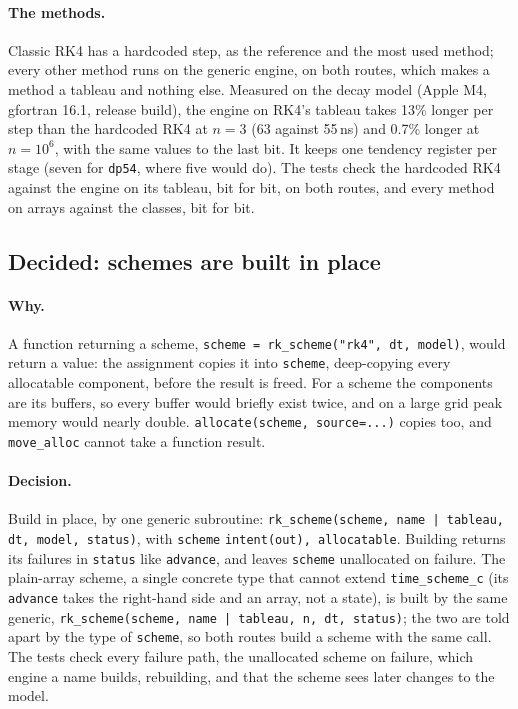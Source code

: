 \documentclass[11pt,a4paper]{article}
\newcommand{\code}[1]{\texttt{#1}}
\begin{document}
\paragraph{The methods.} Classic RK4 has a hardcoded step, as the reference
and the most used method; every other method runs on the generic engine, on
both routes, which makes a method a tableau and nothing else. Measured on the
decay model (Apple M4, gfortran 16.1, release build), the engine on RK4's
tableau takes 13\% longer per step than the hardcoded RK4 at $n = 3$ (63
against 55\,ns) and 0.7\% longer at $n = 10^6$, with the same values to the
last bit. It keeps one tendency register per stage (seven for \code{dp54},
where five would do). The tests check the hardcoded RK4 against the engine on
its tableau, bit for bit, on both routes, and every method on arrays against
the classes, bit for bit.

\subsection{Decided: schemes are built in place}

\paragraph{Why.} A function returning a scheme,
\code{scheme = rk\_scheme("rk4", dt, model)}, would return a value: the
assignment copies it into \code{scheme}, deep-copying every allocatable
component, before the result is freed. For a scheme the components are its
buffers, so every buffer would briefly exist twice, and on a large grid peak
memory would nearly double. \code{allocate(scheme, source=...)} copies too,
and \code{move\_alloc} cannot take a function result.

\paragraph{Decision.} Build in place, by one generic subroutine:
\code{rk\_scheme(scheme, name\,|\,tableau, dt, model, status)}, with
\code{scheme} \code{intent(out), allocatable}. Building returns its failures in
\code{status} like \code{advance}, and leaves \code{scheme} unallocated on
failure. The plain-array scheme, a single concrete type that cannot extend
\code{time\_scheme\_c} (its \code{advance} takes the right-hand side and an
array, not a state), is built by the same generic,
\code{rk\_scheme(scheme, name\,|\,tableau, n, dt, status)}; the two are told
apart by the type of \code{scheme}, so both routes build a scheme with the
same call. The tests check every failure path, the unallocated scheme on
failure, which engine a name builds, rebuilding, and that the scheme sees
later changes to the model.
\end{document}

